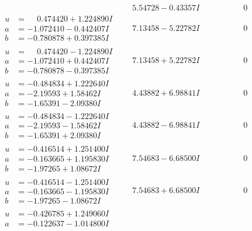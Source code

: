 \documentclass[1p]{elsarticle_modified}
\theoremstyle{definition}
\begin{document}
$$\begin{array}{c|c|c}
 & \phantom{-}5.54728 - 0.43357 I & \phantom{-0.000000 } 0 \\ \hline\begin{aligned}
u &= \phantom{-}0.474420 + 1.224890 I \\
a &= -1.072410 - 0.442407 I \\
b &= -0.780878 + 0.397385 I\end{aligned}
 & \phantom{-}7.13458 - 5.22782 I & \phantom{-0.000000 } 0 \\ \hline\begin{aligned}
u &= \phantom{-}0.474420 - 1.224890 I \\
a &= -1.072410 + 0.442407 I \\
b &= -0.780878 - 0.397385 I\end{aligned}
 & \phantom{-}7.13458 + 5.22782 I & \phantom{-0.000000 } 0 \\ \hline\begin{aligned}
u &= -0.484834 + 1.222640 I \\
a &= -2.19593 + 1.58462 I \\
b &= -1.65391 - 2.09380 I\end{aligned}
 & \phantom{-}4.43882 + 6.98841 I & \phantom{-0.000000 } 0 \\ \hline\begin{aligned}
u &= -0.484834 - 1.222640 I \\
a &= -2.19593 - 1.58462 I \\
b &= -1.65391 + 2.09380 I\end{aligned}
 & \phantom{-}4.43882 - 6.98841 I & \phantom{-0.000000 } 0 \\ \hline\begin{aligned}
u &= -0.416514 + 1.251400 I \\
a &= -0.163665 + 1.195830 I \\
b &= -1.97265 + 1.08672 I\end{aligned}
 & \phantom{-}7.54683 - 6.68500 I & \phantom{-0.000000 } 0 \\ \hline\begin{aligned}
u &= -0.416514 - 1.251400 I \\
a &= -0.163665 - 1.195830 I \\
b &= -1.97265 - 1.08672 I\end{aligned}
 & \phantom{-}7.54683 + 6.68500 I & \phantom{-0.000000 } 0 \\ \hline\begin{aligned}
u &= -0.426785 + 1.249060 I \\
a &= -0.122637 - 1.014800 I \\

\end{aligned}
\end{array}$$
\end{document}
